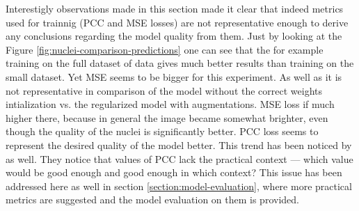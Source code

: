 Interestigly observations made in this section made it clear that indeed metrics used for trainnig (PCC and MSE losses) are not representative enough to derive any conclusions regarding the model quality from them. Just by looking at the Figure \ref{fig:nuclei-comparison-predictions} one can see that the for example training on the full dataset of data gives much better results than training on the small dataset. Yet MSE seems to be bigger for this experiment. As well as it is not representative in comparison of the model without the correct weights intialization vs. the regularized model with augmentations. MSE loss if much higher there, because in general the image became somewhat brighter, even though the quality of the nuclei is significantly better. PCC loss seems to represent the desired quality of the model better. This trend has been noticed by \cite{Lachance_2020} as well. They notice that values of PCC lack the practical context --- which value would be good enough and good enough in which context? This issue has been addressed here as well in section \ref{section:model-evaluation}, where more practical metrics are suggested and the model evaluation on them is provided.